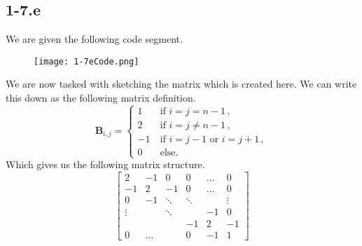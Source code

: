 \documentclass{article}
\begin{document}
\subsection*{1-7.e}
We are given the following code segment.
\begin{figure}[!hbt]
    \centering
\texttt{[image: 1-7eCode.png]}
\end{figure}

\noindent We are now tasked with sketching the matrix which is created here.  We can write this down as the following matrix definition.
\begin{equation*}
    \mathbf{B}_{i,j} = 
    \begin{cases}
        1 \quad &\text{if } i = j = n-1 \, ,\\
        2  &\text{if } i = j \neq n-1 \, ,\\
        -1 &\text{if } i = j - 1 \text{ or } i = j + 1 \, ,\\
        0 &\text{else.}
    \end{cases}
\end{equation*}
Which gives us the following matrix structure.
\begin{equation*}
    \begin{bmatrix}
        2 & -1 & 0 & 0 &\dots & 0 \\
        -1 & 2 & -1 & 0 & \dots & 0 \\
        0  & -1 & \ddots & \ddots & & \vdots \\
        \vdots & & \ddots & &-1 & 0\\
        & & &-1 &2 &-1\\
        0 & \dots & &0 & -1 & 1
    \end{bmatrix}
\end{equation*}
\end{document}
